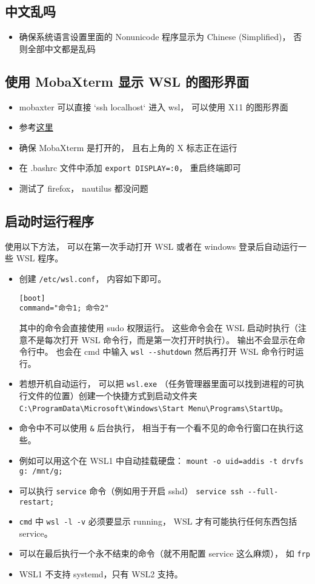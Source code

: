 \subsection{中文乱吗}
\begin{itemize}
\item 确保系统语言设置里面的 Nonunicode 程序显示为 Chinese (Simplified)， 否则全部中文都是乱码
\end{itemize}

\subsection{使用 MobaXterm 显示 WSL 的图形界面}
\begin{itemize}
\item mobaxter 可以直接 `ssh localhost` 进入 wsl， 可以使用 X11 的图形界面
\item 参考\href{https://nickjanetakis.com/blog/using-wsl-and-mobaxterm-to-create-a-linux-dev-environment-on-windows}{这里}
\item 确保 MobaXterm 是打开的， 且右上角的 X 标志正在运行
\item 在 .bashrc 文件中添加 \verb`export DISPLAY=:0`， 重启终端即可
\item 测试了 firefox， nautilus 都没问题
\end{itemize}

\subsection{启动时运行程序}
使用以下方法， 可以在第一次手动打开 WSL 或者在 windows 登录后自动运行一些 WSL 程序。

\begin{itemize}
\item 创建 \verb|/etc/wsl.conf|， 内容如下即可。
\begin{lstlisting}[language=none]
[boot]
command="命令1; 命令2"
\end{lstlisting}
其中的命令会直接使用 sudo 权限运行。 这些命令会在 WSL 启动时执行（注意不是每次打开 WSL 命令行，而是第一次打开时执行）。 输出不会显示在命令行中。 也会在 cmd 中输入 \verb|wsl --shutdown| 然后再打开 WSL 命令行时运行。
\item 若想开机自动运行， 可以把 \verb|wsl.exe| （任务管理器里面可以找到进程的可执行文件的位置）创建一个快捷方式到启动文件夹 \verb|C:\ProgramData\Microsoft\Windows\Start Menu\Programs\StartUp|。
\item 命令中不可以使用 \verb|&| 后台执行， 相当于有一个看不见的命令行窗口在执行这些。
\item 例如可以用这个在 WSL1 中自动挂载硬盘： \verb|mount -o uid=addis -t drvfs g: /mnt/g;|
\item 可以执行 \verb|service| 命令（例如用于开启 sshd） \verb|service ssh --full-restart;|
\item \verb|cmd| 中 \verb|wsl -l -v| 必须要显示 running， WSL 才有可能执行任何东西包括 service。
\item 可以在最后执行一个永不结束的命令（就不用配置 service 这么麻烦）， 如 \verb|frp|
\item WSL1 不支持 systemd，只有 WSL2 支持。
\end{itemize}

